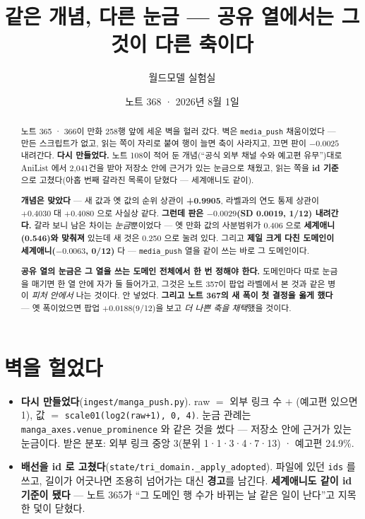 \documentclass[11pt]{article}
\begin{document}
\title{같은 개념, 다른 눈금 --- 공유 열에서는 그것이 다른 축이다}
\author{월드모델 실험실}
\date{노트 368 · 2026년 8월 1일}
\maketitle

\begin{abstract}
노트 365 · 366이 만화 258행 앞에 세운 벽을 헐러 갔다. 벽은
\texttt{media\_push} 채움이었다 --- 만든 스크립트가 없고, 읽는 쪽이 자리로
붙여 행이 늘면 축이 사라지고, 끄면 판이 $-0.0025$ 내려간다. \textbf{다시
만들었다.} 노트 108이 적어 둔 개념(``공식 외부 채널 수와 예고편 유무'')대로
AniList 에서 2,041건을 받아 저장소 안에 근거가 있는 눈금으로 채웠고, 읽는
쪽을 \textbf{id 기준}으로 고쳤다(아홉 번째 갈라진 목록이 닫혔다 --- 세계애니도
같이).

\textbf{개념은 맞았다} --- 새 값과 옛 값의 순위 상관이 \textbf{+0.9905},
라벨과의 연도 통제 상관이 $+0.4030$ 대 $+0.4080$ 으로 사실상 같다.
\textbf{그런데 판은 $-0.0029$(SD 0.0019, 1/12) 내려간다.} 갈라 보니
남은 차이는 \emph{눈금}뿐이었다 --- 옛 만화 값의 사분범위가 0.406 으로
\textbf{세계애니(0.546)와 맞춰져} 있는데 새 것은 0.250 으로 눌려 있다.
그리고 \textbf{제일 크게 다친 도메인이 세계애니($-0.0063$, 0/12)} 다 ---
\texttt{media\_push} 열을 같이 쓰는 바로 그 도메인이다.

\textbf{공유 열의 눈금은 그 열을 쓰는 도메인 전체에서 한 번 정해야 한다.}
도메인마다 따로 눈금을 매기면 한 열 안에 자가 둘 들어가고, 그것은 노트
357이 팝업 라벨에서 본 것과 같은 병이 \emph{피처 안에서} 나는 것이다.
안 넣었다. \textbf{그리고 노트 367의 새 폭이 첫 결정을 옳게 했다} ---
옛 폭이었으면 팝업 $+0.0188$(9/12)을 보고 \emph{더 나쁜 축을 채택}했을
것이다.
\end{abstract}

\section{벽을 헐었다}

\begin{itemize}
\item \textbf{다시 만들었다}(\texttt{ingest/manga\_push.py}). raw $=$ 외부
링크 수 $+$ (예고편 있으면 1), 값 $=$
\texttt{scale01(log2(raw+1), 0, 4)}. 눈금 관례는
\texttt{manga\_axes.venue\_prominence} 와 같은 것을 썼다 --- 저장소 안에
근거가 있는 눈금이다. 받은 분포: 외부 링크 중앙 3(분위 1·1·3·4·7·13) ·
예고편 24.9\%.
\item \textbf{배선을 id 로 고쳤다}(\texttt{state/tri\_domain.\_apply\_adopted}).
파일에 있던 \texttt{ids} 를 쓰고, 길이가 어긋나면 조용히 넘어가는 대신
\textbf{경고}를 남긴다. \textbf{세계애니도 같이 id 기준이 됐다} --- 노트
365가 ``그 도메인 행 수가 바뀌는 날 같은 일이 난다''고 지목한 덫이 닫혔다.
\end{itemize}
\end{document}
